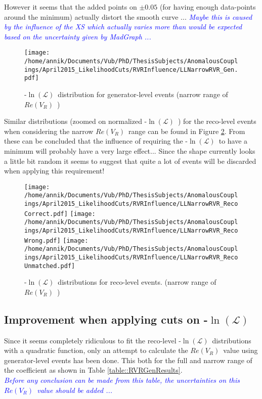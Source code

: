 \documentclass[a4paper,10pt]{article}
\newcommand{\NegLL}{-$\ln(\mathcal{L})$~}
\newcommand{\RVR}{$Re(V_R)$~}
\begin{document}
However it seems that the added points on $\pm 0.05$ (for having enough data-points around the minimum) actually distort the smooth curve ... \textit{\textcolor{blue}{Maybe this is caused by the influence of the XS which actually varies more than would be expected based on the uncertainty given by MadGraph ...}}\\
\begin{figure}[h!t]
 \caption{\NegLL distribution for generator-level events (narrow range of \RVR)} \label{fig::RVRNarrowLL}
 \centering
 \texttt{[image: /home/annik/Documents/Vub/PhD/ThesisSubjects/AnomalousCouplings/April2015\_LikelihoodCuts/RVRInfluence/LLNarrowRVR\_Gen.pdf]}
\end{figure}

Similar distributions (zoomed on normalized \NegLL) for the reco-level events when considering the narrow \RVR range can be found in Figure \ref{fig::RVRNarrowLLRECO}. From these can be concluded that the influence of requiring the \NegLL to have a minimum will probably have a very large effect... Since the shape currently looks a little bit random it seems to suggest that quite a lot of events will be discarded when applying this requirement!\\
\begin{figure}[h!t]
 \centering
 \texttt{[image: /home/annik/Documents/Vub/PhD/ThesisSubjects/AnomalousCouplings/April2015\_LikelihoodCuts/RVRInfluence/LLNarrowRVR\_RecoCorrect.pdf]}
 \texttt{[image: /home/annik/Documents/Vub/PhD/ThesisSubjects/AnomalousCouplings/April2015\_LikelihoodCuts/RVRInfluence/LLNarrowRVR\_RecoWrong.pdf]}
 \texttt{[image: /home/annik/Documents/Vub/PhD/ThesisSubjects/AnomalousCouplings/April2015\_LikelihoodCuts/RVRInfluence/LLNarrowRVR\_RecoUnmatched.pdf]}
 \caption{\NegLL distributions for reco-level events. (narrow range of \RVR)} \label{fig::RVRNarrowLLRECO}
\end{figure}

\subsection{Improvement when applying cuts on \NegLL}
Since it seems completely ridiculous to fit the reco-level \NegLL distributions with a quadratic function, only an attempt to calculate the \RVR value using generator-level events has been done. This both for the full and narrow range of the coefficient as shown in Table \ref{table::RVRGenResults}.\\
\textit{\textcolor{blue}{Before any conclusion can be made from this table, the uncertainties on this \RVR value should be added ...}}
\end{document}
